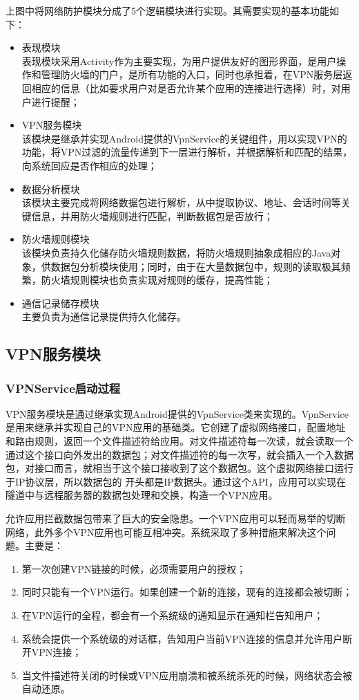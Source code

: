 \documentclass[format=final, language=chinese, degree=fyp]{hustthesis}
\begin{document}
上图中将网络防护模块分成了5个逻辑模块进行实现。其需要实现的基本功能如下：

\begin{itemize}
	\item 表现模块\\ 表现模块采用Activity作为主要实现，为用户提供友好的图形界面，是用户操作和管理防火墙的门户，是所有功能的入口，同时也承担着，在VPN服务层返回相应的信息（比如要求用户对是否允许某个应用的连接进行选择）时，对用户进行提醒；
	\item VPN服务模块\\该模块是继承并实现Android提供的VpnService的关键组件，用以实现VPN的功能，将VPN过滤的流量传递到下一层进行解析，并根据解析和匹配的结果，向系统回应是否作相应的处理；
	\item 数据分析模块\\该模块主要完成将网络数据包进行解析，从中提取协议、地址、会话时间等关键信息，并用防火墙规则进行匹配，判断数据包是否放行；
	\item 防火墙规则模块\\该模块负责持久化储存防火墙规则数据，将防火墙规则抽象成相应的Java对象，供数据包分析模块使用；同时，由于在大量数据包中，规则的读取极其频繁，防火墙规则模块也负责实现对规则的缓存，提高性能；
	\item 通信记录储存模块\\主要负责为通信记录提供持久化储存。
\end{itemize}

\subsection{VPN服务模块}

\subsubsection{VPNService启动过程}

VPN服务模块是通过继承实现Android提供的VpnService类来实现的。VpnService是用来继承并实现自己的VPN应用的基础类。它创建了虚拟网络接口，配置地址和路由规则，返回一个文件描述符给应用。对文件描述符每一次读，就会读取一个通过这个接口向外发出的数据包；对文件描述符的每一次写，就会插入一个入数据包，对接口而言，就相当于这个接口接收到了这个数据包。这个虚拟网络接口运行于IP协议层，所以数据包的 开头都是IP数据头。通过这个API，应用可以实现在隧道中与远程服务器的数据包处理和交换，构造一个VPN应用。

允许应用拦截数据包带来了巨大的安全隐患。一个VPN应用可以轻而易举的切断网络，此外多个VPN应用也可能互相冲突。系统采取了多种措施来解决这个问题。主要是：
\begin{enumerate}
 	\item 第一次创建VPN链接的时候，必须需要用户的授权；\label{item:1}
	\item 同时只能有一个VPN运行。如果创建一个新的连接，现有的连接都会被切断；
	\item 在VPN运行的全程，都会有一个系统级的通知显示在通知栏告知用户；
	\item 系统会提供一个系统级的对话框，告知用户当前VPN连接的信息并允许用户断开VPN连接；
	\item 当文件描述符关闭的时候或VPN应用崩溃和被系统杀死的时候，网络状态会被自动还原。
\end{enumerate}
\end{document}
